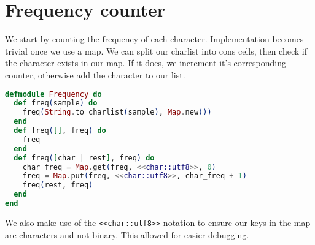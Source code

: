\section{Frequency counter}
We start by counting the frequency of each character. Implementation becomes trivial once we use a map. We can split our charlist into cons cells, then check if the character exists in our map. If it does, we increment it's corresponding counter, otherwise add the character to our list.

\begin{lstlisting}[language=Elixir, title=Frequency]
defmodule Frequency do
  def freq(sample) do
    freq(String.to_charlist(sample), Map.new())
  end
  def freq([], freq) do
    freq
  end
  def freq([char | rest], freq) do
    char_freq = Map.get(freq, <<char::utf8>>, 0)
    freq = Map.put(freq, <<char::utf8>>, char_freq + 1)
    freq(rest, freq)
  end
end
\end{lstlisting}

We also make use of the \texttt{<<char::utf8>>} notation to ensure our keys in the map are characters and not binary. This allowed for easier debugging.